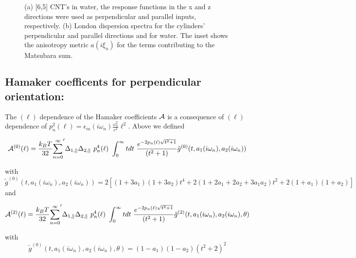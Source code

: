 \documentclass[onecolumn,letterpaper,amsmath,amssymb,floatfix,aps,superscriptaddress]{revtex4}
\begin{document}
\begin{figure}[t!]
\begin{center}
\begin{minipage}[b]{0.40\textwidth}
\begin{center}
\end{center}
\end{minipage}
\caption{(a) [6,5] CNT's in water, the response functions in the x and z
directions were used as perpendicular and parallel inputs, respectively. (b)
London dispersion spectra for the cylinders' perpendicular and parallel
directions and for water. The inset shows the anisotropy metric $a(i\xi_n)$ for
the terms contributing to the Matsubara sum.}
\label{eiz65}
\end{center}
\end{figure} 

\subsection{Hamaker coefficents for perpendicular orientation:}

The $(\ell)$ dependence of the Hamaker coefficients $\cal A$ is a consequence of $(\ell)$ dependence of $p_n^{2}(\ell) =  \epsilon_m(i \omega_n) \frac{\omega_n^{2}}{c^{2}} \ell^{2}$. Above we defined
\begin{widetext}
\begin{equation}
{\cal A}^{(0)}(\ell) = \frac{k_BT}{32}  {\sum_{n=0}^{\infty}}' \Delta_{1,\parallel} \Delta_{2,\parallel} ~p_n^{4}(\ell) ~\int_0^{\infty} t dt ~\frac{e^{- 2 p_n(\ell) \sqrt{t^{2} + 1}}}{(t^{2} + 1)} \tilde g^{(0)}(t, a_1(i \omega_n), a_2(i \omega_n))
\end{equation}
\end{widetext}
with
\begin{equation}
\tilde g^{(0)}(t, a_1(i \omega_n), a_2(i \omega_n)) = 2 \left[ (1+3a_1)(1+3a_2) t^{4} + 2 (1+2a_1+2a_2+3a_1a_2) t^{2}  + 2(1+a_1)(1+a_2)\right]
\end{equation}
and
\begin{widetext}
\begin{equation}
{\cal A}^{(2)}(\ell) = \frac{k_BT}{32}  {\sum_{n=0}^{\infty}}' \Delta_{1,\parallel} \Delta_{2,\parallel} ~p_n^{4}(\ell) ~\int_0^{\infty} t dt ~\frac{e^{- 2 p_n(\ell) \sqrt{t^{2} + 1}}}{(t^{2} + 1)} \tilde g^{(2)}(t, a_1(i \omega_n), a_2(i \omega_n), \theta)
\end{equation}
\end{widetext}
with
\begin{equation}
\tilde g^{(0)}(t, a_1(i \omega_n), a_2(i \omega_n), \theta) = (1-a_1)(1-a_2)(t^{2} + 2)^2
\label{befgqw}
\end{equation}
\end{document}
